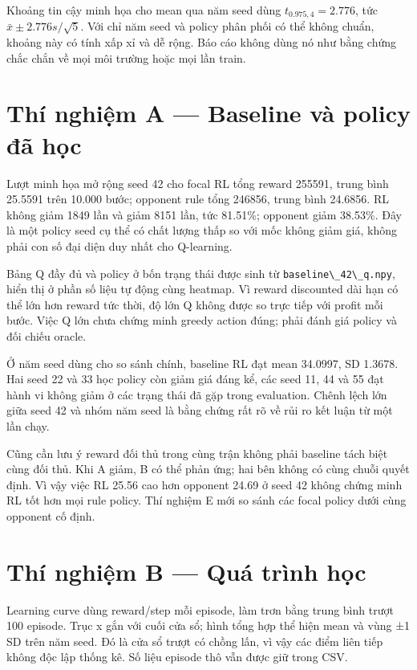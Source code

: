 Khoảng tin cậy minh họa cho mean qua năm seed dùng
\(t_{0.975,4}=2.776\), tức \(\bar x\pm2.776s/\sqrt5\). Với chỉ năm seed
và policy phân phối có thể không chuẩn, khoảng này có tính xấp xỉ và dễ
rộng. Báo cáo không dùng nó như bằng chứng chắc chắn về mọi môi trường
hoặc mọi lần train.

\section{Thí nghiệm A --- Baseline và policy đã
học}\label{thuxed-nghiux1ec7m-a-baseline-vuxe0-policy-ux111uxe3-hux1ecdc}

Lượt minh họa mở rộng seed 42 cho focal RL tổng reward 255591, trung
bình 25.5591 trên 10.000 bước; opponent rule tổng 246856, trung bình
24.6856. RL không giảm 1849 lần và giảm 8151 lần, tức 81.51\%; opponent
giảm 38.53\%. Đây là một policy seed cụ thể có chất lượng thấp so với
mốc không giảm giá, không phải con số đại diện duy nhất cho Q-learning.

Bảng Q đầy đủ và policy ở bốn trạng thái được sinh từ
\passthrough{\lstinline!baseline\_42\_q.npy!}, hiển thị ở phần số liệu
tự động cùng heatmap. Vì reward discounted dài hạn có thể lớn hơn reward
tức thời, độ lớn Q không được so trực tiếp với profit mỗi bước. Việc Q
lớn chưa chứng minh greedy action đúng; phải đánh giá policy và đối
chiếu oracle.

Ở năm seed dùng cho so sánh chính, baseline RL đạt mean 34.0997, SD
1.3678. Hai seed 22 và 33 học policy còn giảm giá đáng kể, các seed 11,
44 và 55 đạt hành vi không giảm ở các trạng thái đã gặp trong
evaluation. Chênh lệch lớn giữa seed 42 và nhóm năm seed là bằng chứng
rất rõ về rủi ro kết luận từ một lần chạy.

Cũng cần lưu ý reward đối thủ trong cùng trận không phải baseline tách
biệt cùng đối thủ. Khi A giảm, B có thể phản ứng; hai bên không có cùng
chuỗi quyết định. Vì vậy việc RL 25.56 cao hơn opponent 24.69 ở seed 42
không chứng minh RL tốt hơn mọi rule policy. Thí nghiệm E mới so sánh
các focal policy dưới cùng opponent cố định.

\section{Thí nghiệm B --- Quá trình
học}\label{thuxed-nghiux1ec7m-b-quuxe1-truxecnh-hux1ecdc}

Learning curve dùng reward/step mỗi episode, làm trơn bằng trung bình
trượt 100 episode. Trục x gắn với cuối cửa sổ; hình tổng hợp thể hiện
mean và vùng ±1 SD trên năm seed. Đó là cửa sổ trượt có chồng lấn, vì
vậy các điểm liên tiếp không độc lập thống kê. Số liệu episode thô vẫn
được giữ trong CSV.

